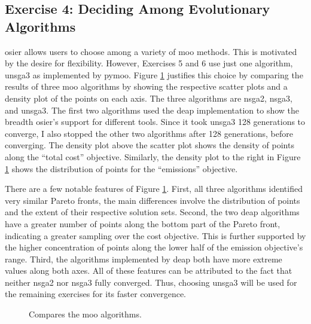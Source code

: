 \subsection{Exercise 4: Deciding Among Evolutionary Algorithms}

\ac{osier} allows users to choose among a variety of \ac{moo} methods. This is
motivated by the desire for flexibility. However, Exercises 5 and 6 use just one
algorithm, \ac{unsga3} as implemented by \ac{pymoo}. Figure
\ref{fig:algorithm-comparison} justifies this choice by comparing the results of
three \ac{moo} algorithms by showing the respective scatter plots and a density
plot of the points on each axis. The three algorithms are \ac{nsga2},
\ac{nsga3}, and \ac{unsga3}. The first two algorithms used the \ac{deap}
implementation to show the breadth \ac{osier}'s support for different tools.
Since it took \ac{unsga3} 128 generations to converge, I also stopped the other
two algorithms after 128 generations, before converging. The density plot above
the scatter plot shows the density of points along the ``total cost'' objective.
Similarly, the density plot to the right in Figure
\ref{fig:algorithm-comparison} shows the distribution of points for the
``emissions'' objective.

There are a few notable features of Figure \ref{fig:algorithm-comparison}.
First, all three algorithms identified very similar Pareto fronts, the main
differences involve the distribution of points and the extent of their
respective solution sets. Second, the two \ac{deap} algorithms have a greater
number of points along the bottom part of the Pareto front, indicating a greater
sampling over the cost objective. This is further supported by the higher
concentration of points along the lower half of the emission objective's range.
Third, the algorithms implemented by \ac{deap} both have more extreme values
along both axes. All of these features can be attributed to the fact that
neither \ac{nsga2} nor \ac{nsga3} fully converged. Thus, choosing \ac{unsga3}
will be used for the remaining exercises for its faster convergence.

\begin{figure}[ht]
  \centering
  \resizebox{0.75\columnwidth}{!}{}
  \caption{Compares the \ac{moo} algorithms.}
  \label{fig:algorithm-comparison}
\end{figure}

\FloatBarrier
